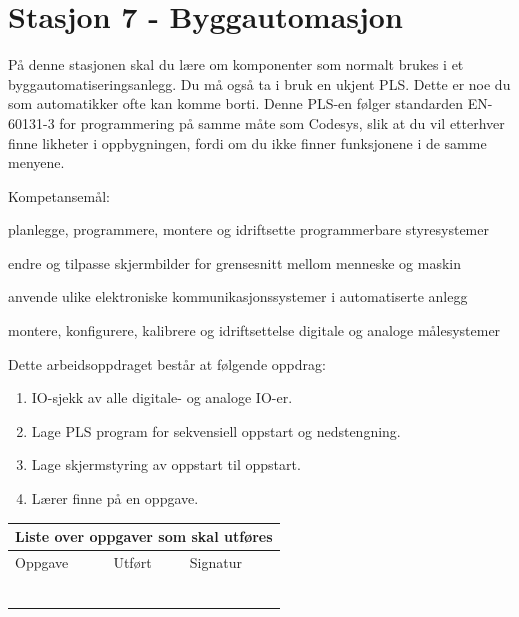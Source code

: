 
\noindent
\section*{Stasjon 7 - Byggautomasjon}

\vskip 5pt

På denne stasjonen skal du lære om komponenter som normalt brukes i et byggautomatiseringsanlegg. Du må også ta i bruk en ukjent PLS. Dette er noe du som automatikker ofte kan komme borti. Denne PLS-en følger standarden EN-60131-3 for programmering på samme måte som Codesys, slik at du vil etterhver finne likheter i oppbygningen, fordi om du ikke finner funksjonene i de samme menyene. 

Kompetansemål:

planlegge, programmere, montere og idriftsette programmerbare styresystemer

endre og tilpasse skjermbilder for grensesnitt mellom menneske og maskin

anvende ulike elektroniske kommunikasjonssystemer i automatiserte anlegg

montere, konfigurere, kalibrere og idriftsettelse digitale og analoge målesystemer

Dette arbeidsoppdraget består at følgende oppdrag:
\begin{enumerate}
	\item IO-sjekk av alle digitale- og analoge IO-er. 
	\item Lage PLS program for sekvensiell oppstart og nedstengning. 
	\item Lage skjermstyring av oppstart til oppstart.
	\item Lærer finne på en oppgave. 
\end{enumerate}
\begin{center}
\begin{tabular}{ | m{8cm} | m{1cm}| m{2cm} | } 
\hline
\multicolumn{3}{|c|}{Liste over oppgaver som skal utføres} \\
	\hline
	Oppgave	& Utført & Signatur \\ 
	\hline
	\hline
	& & \\ 
	\hline
	& & \\ 
	\hline
	& & \\ 
	\hline
	& & \\ 
	\hline
	& & \\ 
	\hline
	& & \\ 
	\hline
\end{tabular}
\end{center}
